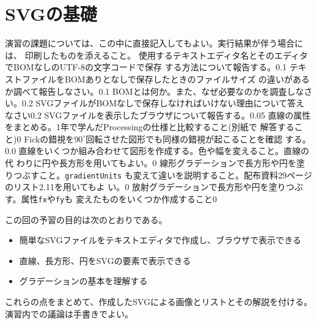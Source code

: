 \documentclass[a4j]{jreport}
\begin{document}
\chapter{SVGの基礎}
演習の課題については、この中に直接記入してもよい。実行結果が伴う場合には、
印刷したものを添えること。
 {
 {使用するテキストエディタ名とそのエディタでBOMなしのUTF-8の文字コードで保存
  する方法について報告する。}{0.1}
 {テキストファイルをBOMありとなしで保存したときのファイルサイズ
  の違いがあるか調べて報告しなさい。}{0.1}
  {BOMとは何か。また、なぜ必要なのかを調査しなさい。}{0.2}
%  
  {SVGファイルがBOMなしで保存しなければいけない理由について答えなさい}{0.2}
 }
 {
 {SVGファイルを表示したブラウザについて報告する。}{0.05}
 {直線の属性をまとめる。1年で学んだProcessingの仕様と比較すること(別紙で
 解答すること)}{0}
 {Fickの錯視を$90^{\circ}$回転させた図形でも同様の錯視が起こることを確認
 する。}{0.0}
 {直線をいくつか組み合わせて図形を作成する。色や幅を変えること。直線の代
 わりに円や長方形を用いてもよい。}{0}
 }
 {
 {線形グラデーションで長方形や円を塗りつぶすこと。\texttt{gradientUnits}
 も変えて違いを説明すること。配布資料29ページのリスト2.11を用いてもよ
 い。}{0}
 {放射グラデーションで長方形や円を塗りつぶす。属性\texttt{fx}や\texttt{fy}も
 変えたものをいくつか作成すること}{0}
 }
{この回の予習の目的は次のとおりである。
\begin{itemize}
 \item 簡単なSVGファイルをテキストエディタで作成し、ブラウザで表示できる
 \item 直線、長方形、円をSVGの要素で表示できる
 \item グラデーションの基本を理解する
\end{itemize}
これらの点をまとめて、作成したSVGによる画像とリストとその解説を付ける。
演習内での議論は手書きでよい。}
\end{document}
